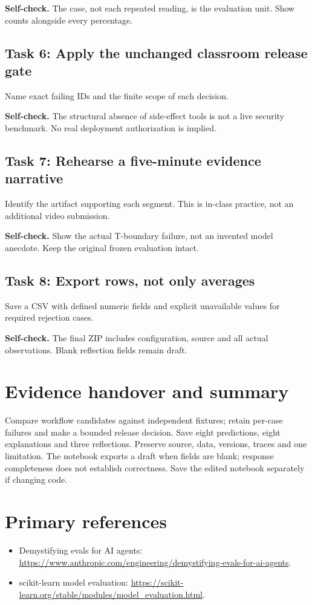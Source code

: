 \textbf{Self-check.} The case, not each repeated reading, is the evaluation unit. Show counts alongside every percentage.
\subsection{Task 6: Apply the unchanged classroom release gate}
Name exact failing IDs and the finite scope of each decision.

\textbf{Self-check.} The structural absence of side-effect tools is not a live security benchmark. No real deployment authorization is implied.
\subsection{Task 7: Rehearse a five-minute evidence narrative}
Identify the artifact supporting each segment. This is in-class practice, not an additional video submission.

\textbf{Self-check.} Show the actual T-boundary failure, not an invented model anecdote. Keep the original frozen evaluation intact.
\subsection{Task 8: Export rows, not only averages}
Save a CSV with defined numeric fields and explicit unavailable values for required rejection cases.

\textbf{Self-check.} The final ZIP includes configuration, source and all actual observations. Blank reflection fields remain draft.
\section{Evidence handover and summary}
Compare workflow candidates against independent fixtures; retain per-case failures and make a bounded release decision. Save eight predictions, eight explanations and three reflections. Preserve source, data, versions, traces and one limitation. The notebook exports a draft when fields are blank; response completeness does not establish correctness. Save the edited notebook separately if changing code.
\section{Primary references}
\begin{itemize}
\item Demystifying evals for AI agents: \url{https://www.anthropic.com/engineering/demystifying-evals-for-ai-agents}.
\item scikit-learn model evaluation: \url{https://scikit-learn.org/stable/modules/model_evaluation.html}.
\end{itemize}
